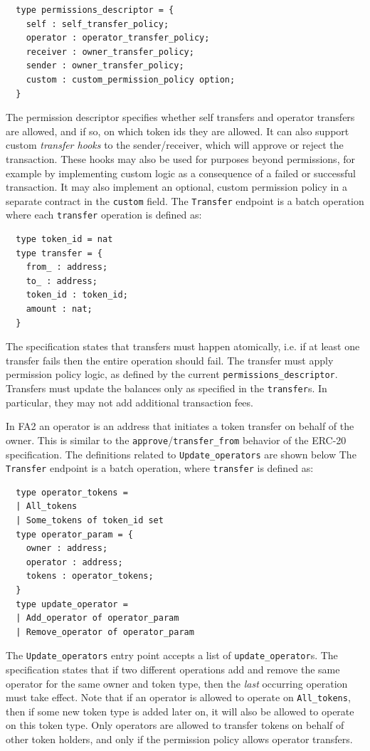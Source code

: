 \documentclass[twoside,11pt,openright]{report}
\newcommand{\coq}[1]{\texttt{#1}}
\begin{document}
\begin{verbatim}
  type permissions_descriptor = {
    self : self_transfer_policy;
    operator : operator_transfer_policy;
    receiver : owner_transfer_policy;
    sender : owner_transfer_policy;
    custom : custom_permission_policy option;
  }
\end{verbatim}
The permission descriptor specifies whether self transfers and operator transfers are allowed, and if so, on which token ids they are allowed. It can also support custom \textit{transfer hooks} to the sender/receiver, which will approve or reject the transaction. These hooks may also be used for purposes beyond permissions, for example by implementing custom logic as a consequence of a failed or successful transaction. It may also implement an optional, custom permission policy in a separate contract in the \coq{custom} field.
The \coq{Transfer} endpoint is a batch operation where each \coq{transfer} operation is defined as:
\begin{verbatim}
  type token_id = nat
  type transfer = {
    from_ : address;
    to_ : address;
    token_id : token_id;
    amount : nat;
  }
\end{verbatim}
The specification states that transfers must happen atomically, i.e. if at least one transfer fails then the entire operation should fail. The transfer must apply permission policy logic, as defined by the current \coq{permissions\_descriptor}. Transfers must update the balances only as specified in the \coq{transfer}s. In particular, they may not add additional transaction fees.

In FA2 an operator is an address that initiates a token transfer on behalf of the owner. This is similar to the \coq{approve}/\coq{transfer\_from} behavior of the ERC-20 specification. The definitions related to \coq{Update\_operators} are shown below
The \coq{Transfer} endpoint is a batch operation, where \coq{transfer} is defined as:
\begin{verbatim}
  type operator_tokens =
  | All_tokens
  | Some_tokens of token_id set
  type operator_param = {
    owner : address;
    operator : address;
    tokens : operator_tokens;
  }
  type update_operator =
  | Add_operator of operator_param
  | Remove_operator of operator_param
\end{verbatim}
The \coq{Update\_operators} entry point accepts a list of \coq{update\_operator}s. The specification states that if two different operations add and remove the same operator for the same owner and token type, then the \textit{last} occurring operation must take effect. Note that if an operator is allowed to operate on \coq{All\_tokens}, then if some new token type is added later on, it will also be allowed to operate on this token type. Only operators are allowed to transfer tokens on behalf of other token holders, and only if the permission policy allows operator transfers.
\end{document}
